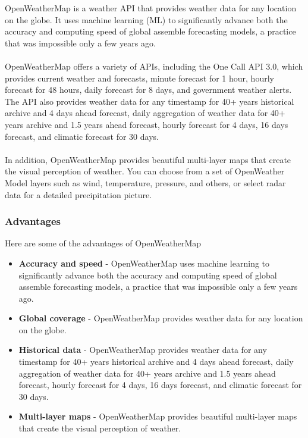 \documentclass[../paper.tex]{subfiles}
\begin{document}
    OpenWeatherMap is a weather API that provides weather data for any location on the globe.
    It uses machine learning (ML) to significantly advance both the accuracy and computing speed of global assemble forecasting models, a practice that was impossible only a few years ago\cite{b1}.
    \\\\
    OpenWeatherMap offers a variety of APIs, including the One Call API 3.0, which provides current weather and forecasts, minute forecast for 1 hour, hourly forecast for 48 hours, daily forecast for 8 days, and government weather alerts\cite{b1}.
    The API also provides weather data for any timestamp for 40+ years historical archive and 4 days ahead forecast, daily aggregation of weather data for 40+ years archive and 1.5 years ahead forecast, hourly forecast for 4 days, 16 days forecast, and climatic forecast for 30 days\cite{b1}.
    \\\\
    In addition, OpenWeatherMap provides beautiful multi-layer maps that create the visual perception of weather.
    You can choose from a set of OpenWeather Model layers such as wind, temperature, pressure, and others, or select radar data for a detailed precipitation picture\cite{b1}.

    \subsubsection{Advantages}
    Here are some of the advantages of OpenWeatherMap
    \begin{itemize}
        \item \textbf{Accuracy and speed} - OpenWeatherMap uses machine learning to significantly advance both the accuracy and computing speed of global assemble forecasting models, a practice that was impossible only a few years ago\cite{b1}.
        \item \textbf{Global coverage} - OpenWeatherMap provides weather data for any location on the globe\cite{b1}.
        \item \textbf{Historical data} - OpenWeatherMap provides weather data for any timestamp for 40+ years historical archive and 4 days ahead forecast, daily aggregation of weather data for 40+ years archive and 1.5 years ahead forecast, hourly forecast for 4 days, 16 days forecast, and climatic forecast for 30 days\cite{b1}.
        \item \textbf{Multi-layer maps} - OpenWeatherMap provides beautiful multi-layer maps that create the visual perception of weather\cite{b1}.
    \end{itemize}
\end{document}
